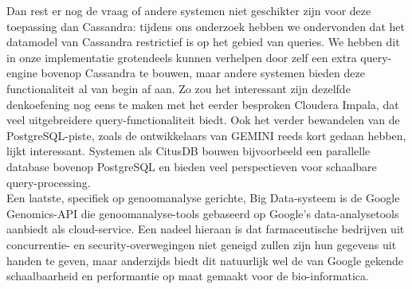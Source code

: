 Dan rest er nog de vraag of andere systemen niet geschikter zijn voor deze toepassing dan Cassandra: tijdens ons onderzoek hebben we ondervonden dat het datamodel van Cassandra restrictief is op het gebied van queries. We hebben dit in onze implementatie grotendeels kunnen verhelpen door zelf een extra query-engine bovenop Cassandra te bouwen, maar andere systemen bieden deze functionaliteit al van begin af aan. Zo zou het interessant zijn dezelfde denkoefening nog eens te maken met het eerder besproken Cloudera Impala, dat veel uitgebreidere query-functionaliteit biedt. Ook het verder bewandelen van de PostgreSQL-piste, zoals de ontwikkelaars van GEMINI reeds kort gedaan hebben, lijkt interessant. Systemen als CitusDB \cite{citus_db} bouwen bijvoorbeeld een parallelle database bovenop PostgreSQL en bieden veel perspectieven voor schaalbare query-processing.
\\Een laatste, specifiek op genoomanalyse gerichte, Big Data-systeem is de Google Genomics-API\cite{google_genomics} die genoomanalyse-tools gebaseerd op Google's data-analysetools aanbiedt als cloud-service. Een nadeel hieraan is dat farmaceutische bedrijven uit concurrentie- en security-overwegingen niet geneigd zullen zijn hun gegevens uit handen te geven, maar anderzijds biedt dit natuurlijk wel de van Google gekende schaalbaarheid en performantie op maat gemaakt voor de bio-informatica.